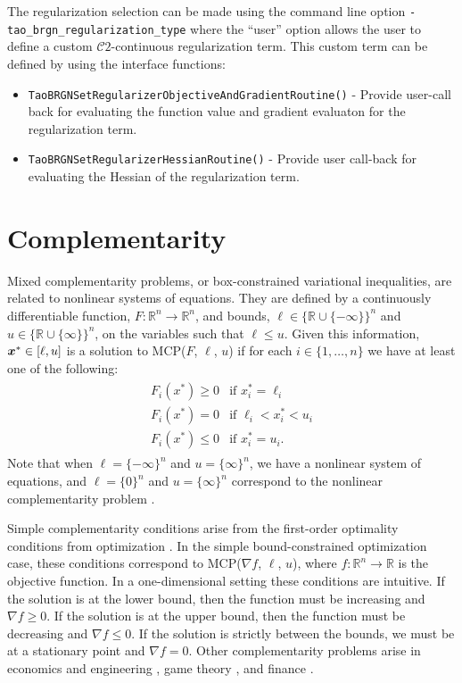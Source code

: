 \documentclass[]{book}
\newcommand{\x}{\mbox{\boldmath \(x\)}}
\newcommand{\R}{\mathbb R}
\renewcommand{\Re}{\R}
\begin{document}
The regularization selection can be made using the command line option \texttt{-tao\_brgn\_regularization\_type} 
{\tt <l2pure, l2prox, l1dict, user>} where the ``user'' option allows the user to define a custom 
$\mathcal{C}2$-continuous regularization term. This custom term can be defined by using the 
interface functions:
\begin{itemize} 
  \item {\tt TaoBRGNSetRegularizerObjectiveAndGradientRoutine()} - Provide user-call back for 
        evaluating the function value and gradient evaluaton for the regularization term.
  \item {\tt TaoBRGNSetRegularizerHessianRoutine()} - Provide user call-back for evaluating the 
        Hessian of the regularization term.
\end{itemize}

\section{Complementarity}
\label{sec:complementarity}

Mixed complementarity problems, or box-constrained variational inequalities,
are related to nonlinear systems of equations.  They are defined by a 
continuously differentiable function,
$F:\Re^n \to \Re^n$, and bounds, $\ell \in \{\Re \cup \{-\infty\}\}^n$ 
and $u \in \{\Re \cup \{\infty\}\}^n$, on the variables such that 
$\ell \leq u$.  Given this information, $\x^* \in [\ell,u]$ is a solution to 
MCP($F$, $\ell$, $u$) if for each $i \in \{1, \ldots, n\}$ we have at
least one of the following:
\begin{eqnarray*}
\begin{array}{ll}
F_i(x^*) \geq 0 & \mbox{if } x^*_i = \ell_i \\
F_i(x^*) = 0 & \mbox{if } \ell_i < x^*_i < u_i \\
F_i(x^*) \leq 0 & \mbox{if } x^*_i = u_i.
\end{array}
\end{eqnarray*}
Note that when $\ell = \{-\infty\}^n$ and $u = \{\infty\}^n$, we have a 
nonlinear system of equations, and $\ell = \{0\}^n$ and $u = \{\infty\}^n$ 
correspond to the nonlinear complementarity problem \cite{cottle:nonlinear}.

Simple complementarity conditions arise from the first-order optimality 
conditions from optimization \cite{karush:minima, kuhn.tucker:nonlinear}.  
In the simple bound-constrained optimization case, these conditions 
correspond to MCP($\nabla f$, $\ell$, $u$), where $f: \Re^n \to \Re$ 
is the objective function.  In a one-dimensional setting these conditions 
are intuitive.  If the solution is at the lower bound, then the function must 
be increasing and $\nabla f \geq 0$.  If the solution is at the 
upper bound, then the function must be decreasing and $\nabla f \leq 0$.  
If the solution 
is strictly between the bounds, we must be at a stationary point and 
$\nabla f = 0$.  Other complementarity problems arise in economics and 
engineering \cite{ferris.pang:engineering}, game 
theory \cite{nash:equilibrium}, and finance \cite{huang.pang:option}.
\end{document}
